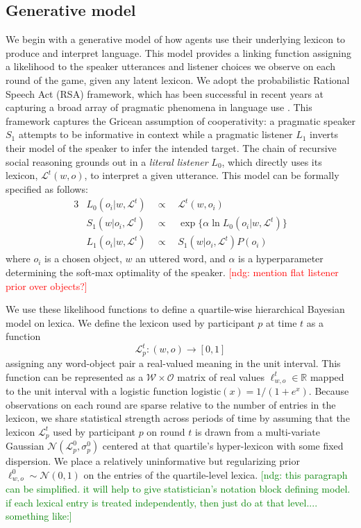 \documentclass[10pt,letterpaper]{article}
\newcommand{\ndg}[1]{\textcolor{Green}{[ndg: #1]}}
\newcommand{\mf}[1]{\textcolor{Red}{[ndg: #1]}}
\begin{document}
\subsection{Generative model}

We begin with a generative model of how agents use their underlying lexicon to produce and interpret language. This model provides a linking function assigning a likelihood to the speaker utterances and listener choices we observe on each round of the game, given any latent lexicon. We adopt the probabilistic Rational Speech Act (RSA) framework, which has been successful in recent years at capturing a broad array of pragmatic phenomena in language use \cite{FrankGoodman12_PragmaticReasoningLanguageGames,GoodmanFrank16_RSATiCS,FrankeJager16_ProbabilisticPragmatics}. This framework captures the Gricean assumption of cooperativity: a pragmatic speaker $S_1$ attempts to be informative in context while a pragmatic listener $L_1$ inverts their model of the speaker to infer the intended target. The chain of recursive social reasoning grounds out in a \emph{literal listener} $L_0$, which directly uses its lexicon, $\mathcal{L}^t(w,o)$, to interpret a given utterance. This model can be formally specified as follows:
\begin{alignat*}{3}
& L_0(o_i | w, \mathcal{L}^t) &\ \ \propto \ \ & \mathcal{L}^t(w,o_i) \\
& S_1(w | o_i, \mathcal{L}^t) &\ \ \propto \ \ & \exp\{\alpha \ln L_0(o_i | w, \mathcal{L}^t)\} \\
& L_1(o_i | w, \mathcal{L}^t) &\ \ \propto \ \ & S_1(w | o_i, \mathcal{L}^t) P(o_i) 
\end{alignat*}
where $o_i$ is a chosen object, $w$ an uttered word, and $\alpha$ is a hyperparameter determining the soft-max optimality of the speaker. \mf{mention flat listener prior over objects?}

We use these likelihood functions to define a quartile-wise hierarchical Bayesian model on lexica. We define the lexicon used by participant $p$ at time $t$ as a function 
$$\mathcal{L}_p^{t} : (w, o) \rightarrow [0,1]$$ 
assigning any word-object pair a real-valued meaning in the unit interval. This function can be represented as a $\mathcal{W} \times \mathcal{O}$ matrix of real values $\ell_{w,o}^t \in \mathbb{R}$ mapped to the unit interval with a logistic function $\text{logistic}(x) = 1/(1 + e^{x})$. Because observations on each round are sparse relative to the number of entries in the lexicon, we share statistical strength across periods of time by assuming that the lexicon $\mathcal{L}^t_p$ used by participant $p$ on round $t$ is drawn from a multi-variate Gaussian $\mathcal{N}(\mathcal{L}^{0}_p, \sigma_p^{0})$ centered at that quartile's hyper-lexicon with some fixed dispersion. We place a relatively uninformative but regularizing prior $\ell_{w,o}^0 \sim \mathcal{N}(0, 1)$ on the entries of the quartile-level lexica. 
\ndg{this paragraph can be simplified. it will help to give statistician's notation block defining model. if each lexical entry is treated independently, then just do at that level.... something like:}
\end{document}
